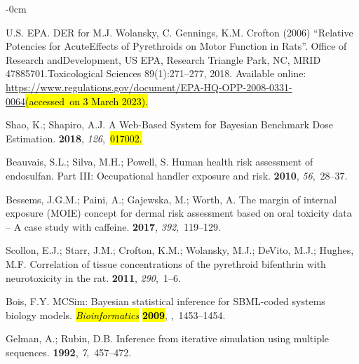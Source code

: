 \documentclass[toxics,article,accept,pdftex,moreauthors]{Definitions/mdpi}
\begin{document}
\begin{adjustwidth}{-\extralength}{0cm}
\begin{thebibliography}{999}
{U.S. EPA}.
\newblock DER for M.J. Wolansky, C. Gennings, K.M. Crofton (2006) ``Relative
  Potencies for AcuteEffects of Pyrethroids on Motor Function in Rats''. Office
  of Research andDevelopment, US EPA, Research Triangle Park, NC, MRID
  47885701.Toxicological Sciences 89(1):271--277,  2018.
\newblock Available online:
  \url{https://www.regulations.gov/document/EPA-HQ-OPP-2008-0331-0064}\linebreak \hl{(accessed~on 3 March 2023).} %


{Shao, K}.; {Shapiro, A.J.}
\newblock A {Web}-{Based} {System} for {Bayesian} {Benchmark} {Dose}
  {Estimation}.
 {\bf 2018}, {\em
  126},~\hl{017002.} %


Beauvais, S.L.; Silva, M.H.; Powell, S.
\newblock Human health risk assessment of endosulfan. {Part} {III}:
  {Occupational} handler exposure and risk.
 {\bf 2010}, {\em
  56},~28--37.

Bessems, J.G.M.; Paini, A.; Gajewska, M.; Worth, A.
\newblock The margin of internal exposure ({MOIE}) concept for dermal risk
  assessment based on oral toxicity data – {A} case study with caffeine.
 {\bf 2017}, {\em 392},~119--129.

Scollon, E.J.; Starr, J.M.; Crofton, K.M.; Wolansky, M.J.; DeVito, M.J.;
  Hughes, M.F.
\newblock Correlation of tissue concentrations of the pyrethroid bifenthrin
  with neurotoxicity in the rat.
 {\bf 2011}, {\em 290},~1--6.

Bois, F.Y.
 {MCSim}: Bayesian statistical inference for {SBML}-coded
  systems biology models. \emph{\hl{Bioinformatics} %
} \textbf{\hl{2009}},
,~1453--1454.

Gelman, A.; Rubin, D.B.
\newblock Inference from iterative simulation using multiple sequences.
 {\bf 1992}, {\em 7},~457--472.


\end{thebibliography}
\end{adjustwidth}
\end{document}
